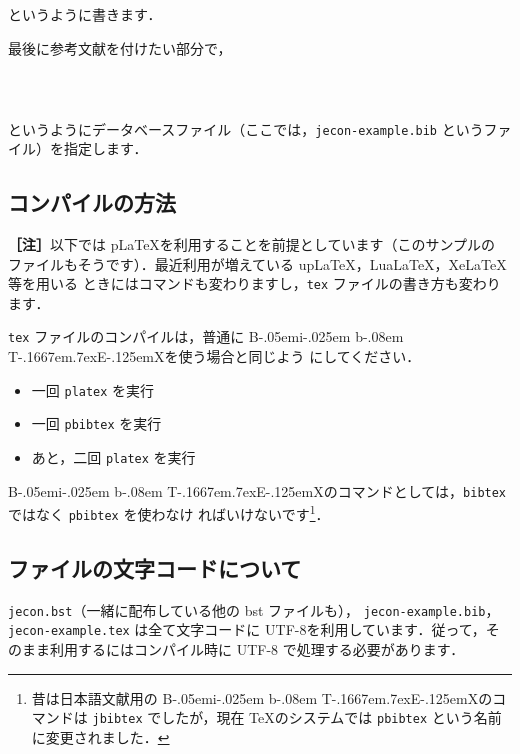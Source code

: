\documentclass[a4j,10pt]{jarticle}
\def\BibTeX{{\rm B\kern-.05em{\sc i\kern-.025em b}\kern-.08em
    T\kern-.1667em\lower.7ex\hbox{E}\kern-.125emX}}
\begin{document}
というように書きます．

最後に参考文献を付けたい部分で，

\begin{screen}
 \begin{verbatim}
        
 
 \end{verbatim}
\end{screen}

というようにデータベースファイル（ここでは，\texttt{jecon-example.bib} というファ
イル）を指定します．

\subsection{コンパイルの方法}

\begin{screen}
\textbf{［注］}以下では p\LaTeX を利用することを前提としています（このサンプルの
ファイルもそうです）．最近利用が増えている upLaTeX，LuaLaTeX，XeLaTeX 等を用いる
ときにはコマンドも変わりますし，\texttt{tex} ファイルの書き方も変わります．
\end{screen}
\vspace*{1em}

\texttt{tex} ファイルのコンパイルは，普通に \BibTeX を使う場合と同じよう
にしてください．

\begin{itemize}
 \item 一回 \texttt{platex} を実行
 \item 一回 \texttt{pbibtex} を実行
 \item あと，二回 \texttt{platex} を実行
\end{itemize}

\BibTeX のコマンドとしては，\texttt{bibtex} ではなく \texttt{pbibtex} を使わなけ
ればいけないです\footnote{昔は日本語文献用の \BibTeX のコマンドは
\texttt{jbibtex} でしたが，現在 \TeX のシステムでは \texttt{pbibtex} という名前
に変更されました．}．

\subsection{ファイルの文字コードについて}

\texttt{jecon.bst}（一緒に配布している他の bst ファイルも），
\texttt{jecon-example.bib}，\texttt{jecon-example.tex} は全て文字コードに
UTF-8を利用しています．従って，そのまま利用するにはコンパイル時に UTF-8
で処理する必要があります．
\end{document}
